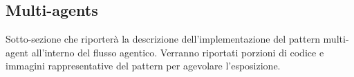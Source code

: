 \subsection{Multi-agents}

Sotto-sezione che riporterà la descrizione dell'implementazione del pattern multi-agent all'interno del flusso agentico.
Verranno riportati porzioni di codice e immagini rappresentative del pattern per agevolare l'esposizione.
